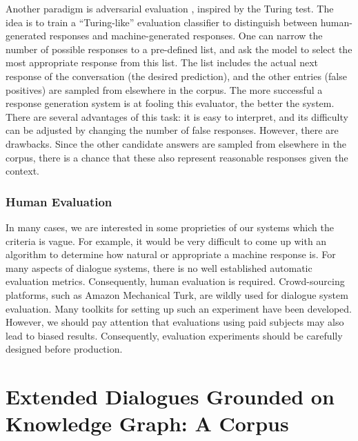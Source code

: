 \documentclass[bsc,frontabs,twoside,singlespacing,parskip,deptreport]{infthesis}     %
\begin{document}
Another paradigm is adversarial evaluation \cite{bowman2015generating,kannan2017adversarial,li2017adversarial}, inspired by the Turing test. The idea is to train a “Turing-like” evaluation classifier to distinguish between human-generated responses and machine-generated responses. One can narrow the number of possible responses to a pre-defined list, and ask the model to select the most appropriate response from this list. The list includes the actual next response of the conversation (the desired prediction), and the other entries (false positives) are sampled from elsewhere in the corpus. The more successful a response generation system is at fooling this evaluator, the better the system. There are several advantages of this task: it is easy to interpret, and its difficulty can be adjusted by changing the number of false responses. However, there are drawbacks. Since the other candidate answers are sampled from elsewhere in the corpus, there is a chance that these also represent reasonable responses given the context. 

\subsection{Human Evaluation}

In many cases, we are interested in some proprieties of our systems which the criteria is vague. For example, it would be very difficult to come up with an algorithm to determine how natural or appropriate a machine response is. For many aspects of dialogue systems, there is no well established automatic evaluation metrics. Consequently, human evaluation is required. Crowd-sourcing platforms, such as Amazon Mechanical Turk\cite{mturk}, are wildly used for dialogue system evaluation. Many toolkits for setting up such an experiment have been developed\cite{lee2018dialcrowd}. However, we should pay attention that evaluations using paid subjects may also lead to biased results\cite{young2013pomdp}. Consequently, evaluation experiments should be carefully designed before production.



\chapter{Extended Dialogues Grounded on Knowledge Graph: A Corpus}
\end{document}
